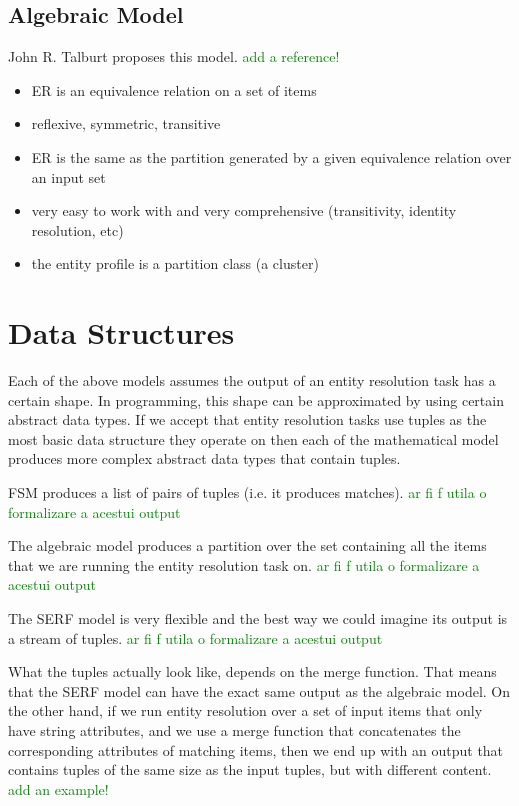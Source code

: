 \documentclass[11pt]{article}
\begin{document}
    \subsection[algebraic]{Algebraic Model}\label{subsec:algebraic}

    John R. Talburt proposes this model. 
    \textcolor{green}{add a reference!}
    \begin{itemize}
        \item ER is an equivalence relation on a set of items
        \item reflexive, symmetric, transitive
        \item ER is the same as the partition generated by a given equivalence relation over an input set
        \item very easy to work with and very comprehensive (transitivity, identity resolution, etc)
        \item the entity profile is a partition class (a cluster)
    \end{itemize}

    \section{Data Structures}\label{section:data-structures}

    Each of the above models assumes the output of an entity resolution task has a certain shape. In programming, this shape can be approximated by using certain abstract data types. If we accept that entity resolution tasks use tuples as the most basic data structure they operate on then each of the mathematical model produces more complex abstract data types that contain tuples.

    FSM produces a list of pairs of tuples (i.e. it produces matches). 
    \textcolor{green}{ar fi f utila o formalizare a acestui output}

    The algebraic model produces a partition over the set containing all the items that we are running the entity resolution task on.
    \textcolor{green}{ar fi f utila o formalizare a acestui output}

    The SERF model is very flexible and the best way we could imagine its output is a stream of tuples. 
    \textcolor{green}{ar fi f utila o formalizare a acestui output}

    What the tuples actually look like, depends on the merge function. That means that the SERF model can have the exact same output as the algebraic model. On the other hand, if we run entity resolution over a set of input items that only have string attributes, and we use a merge function that concatenates the corresponding attributes of matching items, then we end up with an output that contains tuples of the same size as the input tuples, but with different content.
    \textcolor{green}{add an example!}
\end{document}
